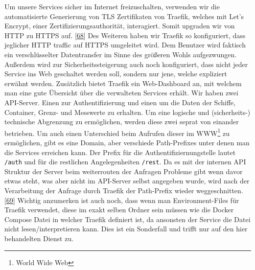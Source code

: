 \documentclass[
    headings=optiontotocandhead,%
    twoside,
    numbers=noenddot,%
    12pt, %
    titlepage, %
    parskip=full, %
    listof=leveldown, 
    numbers=noenddot, %
    a4paper,DIV=14,
    BCOR=15mm,
]{scrbook}
\newcommand{\passthrough}[1]{#1}
\begin{document}
Um unsere Services sicher im Internet freizuschalten, verwenden wir die
automatisierte Generierung von TLS Zertifikaten von Traefik, welches mit
Let's Encrypt, einer Zertifizierungsauthorität, interagiert. Somit
upgraden wir von HTTP zu HTTPS auf.
{[}\protect\hyperlink{ref-traefik-lets-encrypt}{68}{]} Des Weiteren
haben wir Traefik so konfiguriert, dass jeglicher HTTP traffic auf HTTPS
umgeleitet wird. Dem Benutzer wird faktisch ein verschlüsselter
Datentransfer im Sinne des größeren Wohls aufgezwungen. Außerdem wird
zur Sicherheitssteigerung auch noch konfiguriert, dass nicht jeder
Service ins Web geschaltet werden soll, sondern nur jene, welche
expliziert erwähnt werden. Zusätzlich bietet Traefik ein Web-Dashboard
an, mit welchem man eine gute Übersicht über die verwalteten Services
erhält. Wir haben zwei API-Server. Einen zur Authentifizierung und einen
um die Daten der Schiffe, Container, Grenz- und Messwerte zu erhalten.
Um eine logische und (sicherheits-) technische Abgrenzung zu
ermöglichen, werden diese zwei seprat von einander betrieben. Um auch
einen Unterschied beim Aufrufen dieser im WWW\footnote{World Wide Web}
zu ermöglichen, gibt es eine Domain, aber verschiede Path-Prefixes unter
denen man die Services erreichen kann. Der Prefix für die
Authentifiziernungstelle lautet \passthrough{\lstinline!/auth!} und für
die restlichen Angelegenheiten \passthrough{\lstinline!/rest!}. Da es
mit der internen API Struktur der Server beim weiterrouten der Anfragen
Probleme gibt wenn davor etwas steht, was aber nicht im API-Server
selbst angegeben wurde, wird nach der Verarbeitung der Anfrage durch
Traefik der Path-Prefix wieder weggeschnitten.
{[}\protect\hyperlink{ref-gpt-traefik}{69}{]} Wichtig anzumerken ist
auch noch, dass wenn man Environment-Files für Traefik verwendet, diese
im exakt selben Ordner sein müssen wie die Docker Compose Datei in
welcher Traefik definiert ist, da ansonsten der Service die Datei nicht
lesen/interpretieren kann. Dies ist ein Sonderfall und trifft nur auf
den hier behandelten Dienst zu.
\end{document}
